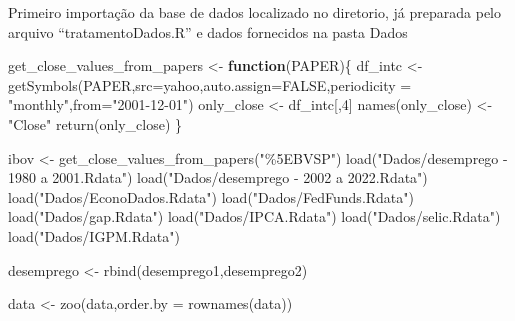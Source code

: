 \documentclass[
]{article}
\newenvironment{Shaded}{\begin{snugshade}}{\end{snugshade}}
\newcommand{\AttributeTok}[1]{\textcolor[rgb]{0.77,0.63,0.00}{#1}}
\newcommand{\ConstantTok}[1]{\textcolor[rgb]{0.00,0.00,0.00}{#1}}
\newcommand{\ControlFlowTok}[1]{\textcolor[rgb]{0.13,0.29,0.53}{\textbf{#1}}}
\newcommand{\DecValTok}[1]{\textcolor[rgb]{0.00,0.00,0.81}{#1}}
\newcommand{\FunctionTok}[1]{\textcolor[rgb]{0.00,0.00,0.00}{#1}}
\newcommand{\NormalTok}[1]{#1}
\newcommand{\OtherTok}[1]{\textcolor[rgb]{0.56,0.35,0.01}{#1}}
\newcommand{\StringTok}[1]{\textcolor[rgb]{0.31,0.60,0.02}{#1}}
\begin{document}
Primeiro importação da base de dados localizado no diretorio, já
preparada pelo arquivo ``tratamentoDados.R'' e dados fornecidos na pasta
Dados

\begin{Shaded}
\begin{Highlighting}[]
\NormalTok{get\_close\_values\_from\_papers }\OtherTok{\textless{}{-}} \ControlFlowTok{function}\NormalTok{(PAPER)\{}
\NormalTok{  df\_intc }\OtherTok{\textless{}{-}} \FunctionTok{getSymbols}\NormalTok{(PAPER,}\AttributeTok{src=}\StringTok{\textquotesingle{}yahoo\textquotesingle{}}\NormalTok{,}\AttributeTok{auto.assign=}\ConstantTok{FALSE}\NormalTok{,}\AttributeTok{periodicity =} \StringTok{"monthly"}\NormalTok{,}\AttributeTok{from=}\StringTok{"2001{-}12{-}01"}\NormalTok{)}
\NormalTok{  only\_close }\OtherTok{\textless{}{-}}\NormalTok{ df\_intc[,}\DecValTok{4}\NormalTok{]}
  \FunctionTok{names}\NormalTok{(only\_close) }\OtherTok{\textless{}{-}} \StringTok{"Close"}
  \FunctionTok{return}\NormalTok{(only\_close)}
\NormalTok{\}}

\NormalTok{ibov }\OtherTok{\textless{}{-}} \FunctionTok{get\_close\_values\_from\_papers}\NormalTok{(}\StringTok{"\%5EBVSP"}\NormalTok{)}
\FunctionTok{load}\NormalTok{(}\StringTok{"Dados/desemprego {-} 1980 a 2001.Rdata"}\NormalTok{)}
\FunctionTok{load}\NormalTok{(}\StringTok{"Dados/desemprego {-} 2002 a 2022.Rdata"}\NormalTok{)}
\FunctionTok{load}\NormalTok{(}\StringTok{"Dados/EconoDados.Rdata"}\NormalTok{)}
\FunctionTok{load}\NormalTok{(}\StringTok{"Dados/FedFunds.Rdata"}\NormalTok{)}
\FunctionTok{load}\NormalTok{(}\StringTok{"Dados/gap.Rdata"}\NormalTok{)}
\FunctionTok{load}\NormalTok{(}\StringTok{"Dados/IPCA.Rdata"}\NormalTok{)}
\FunctionTok{load}\NormalTok{(}\StringTok{"Dados/selic.Rdata"}\NormalTok{)}
\FunctionTok{load}\NormalTok{(}\StringTok{"Dados/IGPM.Rdata"}\NormalTok{)}

\NormalTok{desemprego }\OtherTok{\textless{}{-}} \FunctionTok{rbind}\NormalTok{(desemprego1,desemprego2)}

\NormalTok{data }\OtherTok{\textless{}{-}} \FunctionTok{zoo}\NormalTok{(data,}\AttributeTok{order.by =} \FunctionTok{rownames}\NormalTok{(data))}


\end{Highlighting}
\end{Shaded}
\end{document}
